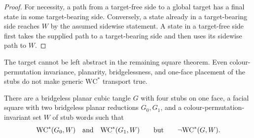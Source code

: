 \begin{proof}
For necessity, a path from a target-free side to a global target has a final
state in some target-bearing side.  Conversely, a state already in a
target-bearing side reaches \(W\) by the assumed sidewise statement.  A
state in a target-free side first takes the supplied path to a
target-bearing side and then uses its sidewise path to \(W\).
\end{proof}

The target cannot be left abstract in the remaining square theorem.
Even colour-permutation invariance, planarity, bridgelessness, and one-face
placement of the stubs do not make generic \(\mathrm{WC}^{*}\) transport true.

\begin{proposition}
\label{prop:generic-wcstar-square-refuted}
There are a bridgeless planar cubic tangle \(G\) with four stubs on one face,
a facial square with two bridgeless planar reductions \(G_0,G_1\), and a
colour-permutation-invariant set \(W\) of stub words such that
\[
  \mathrm{WC}^{*}(G_0,W)\quad\hbox{and}\quad
  \mathrm{WC}^{*}(G_1,W)
  \qquad\hbox{but}\qquad
  \neg\mathrm{WC}^{*}(G,W).
\]
\end{proposition}


